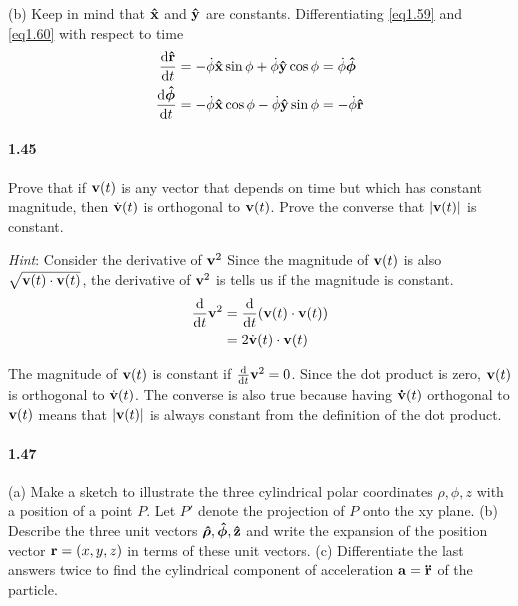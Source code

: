 \documentclass[../problems.tex]{subfiles}
\begin{document}
(b) Keep in mind that $\vb{\hat x}$ and $\vb{\hat y}$ are constants. Differentiating \eqref{eq1.59} 
and \eqref{eq1.60} with respect to time
\begin{align*}
    \dv{\vb{\hat{r}}}{t} &= -\dot{\phi}\vb{\hat x} \sin{\phi}  + \dot{\phi}\vb{\hat y} \cos{\phi} 
    = \dot \phi \vb*{\hat \phi} \\
    \dv{\vb*{\hat \phi}}{t} &= -\dot{\phi}\vb{\hat x} \cos{\phi}  - \dot{\phi}\vb{\hat y} \sin{\phi} 
    = -\dot \phi \vb{\hat r}
\end{align*}

\paragraph{1.45}
Prove that if $\vb{v}(t)$ is any vector that depends on time but which has constant magnitude, then 
$\dot{\vb{v}}(t)$ is orthogonal to $\vb{v}(t)$. Prove the converse that $\abs{\vb{v}(t)}$ is 
constant.
\barh

\textit{Hint}: Consider the derivative of $ \vb{v}^2$
Since the magnitude of $\vb{v}(t)$ is also $\sqrt{\vb{v}(t) \cdot \vb{v}(t)}$, the derivative of 
$\vb{v}^2$ is tells us if the magnitude is constant.
\begin{align*}
    \dv{t} \vb{v}^2 &= \dv{t} (\vb{v}(t) \cdot \vb{v}(t)) \\
    &= 2 \dot{\vb{v}}(t) \cdot \vb{v}(t)
\end{align*}

The magnitude of $\vb{v}(t)$ is constant if $\dv{t} \vb{v}^2 = 0$. Since the dot product is zero, 
$\vb{v}(t)$ is orthogonal to $\dot{\vb{v}}(t)$. The converse is also true because having 
$\vb{\dot v}(t)$ orthogonal to $\vb{v}(t)$ means that $|\vb{v}(t)|$ is always constant from the 
definition of the dot product.

\paragraph{1.47}
(a) Make a sketch to illustrate the three cylindrical polar coordinates $\rho, \phi, z$ with a 
position of a point $P$. Let $P'$ denote the projection of $P$ onto the xy plane.
(b) Describe the three unit vectors $\vb*{\hat \rho}, \vb*{\hat \phi}, \vb{\hat z}$ and write the 
expansion of the position vector $\vb{r} = (x,y,z)$ in terms of these unit vectors. 
(c) Differentiate the last answers twice to find the cylindrical component of acceleration 
$\vb{a} = \vb{\ddot r}$ of the particle.
\barh
\end{document}
